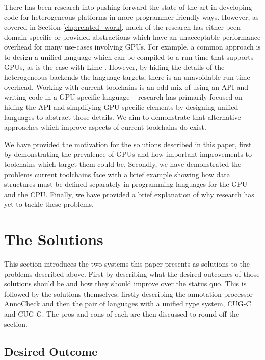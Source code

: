 \documentclass[a4paper,12pt,twoside,openright]{report}
\begin{document}
There has been research into pushing forward the state-of-the-art in developing
code for heterogeneous platforms in more programmer-friendly ways. However, as
covered in Section \ref{chp:related_work}, much of the research has either been
domain-specific or provided abstractions which have an unacceptable performance
overhead for many use-cases involving GPUs. For example, a common approach is
to design a unified language which can be compiled to a run-time that supports
GPUs, as is the case with Lime \cite{Lime2010}. However, by hiding the details
of the heterogeneous backends the language targets, there is an unavoidable
run-time overhead. Working with current toolchains is an odd mix of using an
API and writing code in a GPU-specific language -- research has primarily
focused on hiding the API and simplifying GPU-specific elements by designing
unified languages to abstract those details. We aim to demonstrate that
alternative approaches which improve aspects of current toolchains do exist.

We have provided the motivation for the solutions described in this paper,
first by demonstrating the prevalence of GPUs and how important improvements to
toolchains which target them could be. Secondly, we have demonstrated the
problems current toolchains face with a brief example showing how data
structures must be defined separately in programming languages for the GPU and
the CPU. Finally, we have provided a brief explanation of why research has yet
to tackle these problems.

\section{The Solutions}

\label{sec:solutions_introduction}

This section introduces the two systems this paper presents as solutions to the
problems described above. First by describing what the desired outcomes of
those solutions should be and how they should improve over the status quo. This
is followed by the solutions themselves; firstly describing the annotation
processor AnnoCheck and then the pair of languages with a unified type system,
CUG-C and CUG-G. The pros and cons of each are then discussed to round off
the section.

\subsection{Desired Outcome}
\end{document}
